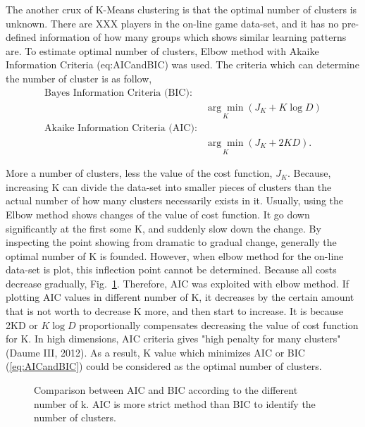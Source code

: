 \documentclass[12pt,a4paper]{report}
\begin{document}

\bigskip
The another crux of K-Means clustering is that the optimal number of clusters is unknown. There are XXX players in the on-line game data-set, and it has no pre-defined information of how many groups which shows similar learning patterns are. To estimate optimal number of clusters, Elbow method with Akaike Information Criteria (eq:AICandBIC) was used. The criteria which can determine the number of cluster is as follow,
\begin{equation} \label{eq:AICandBIC}
    \begin{split}
        \textrm{Bayes Information Criteria (BIC)}:&\\
        &\underset{K}{\arg\min} (J_K + K\log D)\\
        \textrm{Akaike Information Criteria (AIC)}:&\\
        &\underset{K}{\arg\min} (J_K + 2KD).
    \end{split}
\end{equation}

More a number of clusters, less the value of the cost function, $J_K$. Because, increasing K can divide the data-set into smaller pieces of clusters than the actual number of how many clusters necessarily exists in it. Usually, using the Elbow method shows changes of the value of cost function. It go down significantly at the first some K, and suddenly slow down the change. By inspecting the point showing from dramatic to gradual change, generally the optimal number of K is founded. However, when elbow method for the on-line data-set is plot, this inflection point cannot be determined. Because all costs decrease gradually, Fig.~\ref{fig:AIC_BIC_Elbow}. Therefore, AIC was exploited with elbow method. If plotting AIC values in different number of K, it decreases by the certain amount that is not worth to decrease K more, and then start to increase. It is because 2KD or  $K\log D$ proportionally compensates decreasing the value of cost function for K. In high dimensions, AIC criteria gives "high penalty for many clusters" (Daume III, 2012). As a result, K value which minimizes AIC or BIC (\ref{eq:AICandBIC}) could be considered as the optimal number of clusters. 

\begin{figure}[thpb]\label{fig:AIC_BIC_Elbow}
	\centering
	\caption{Comparison between AIC and BIC according to the different number of k. AIC is more strict method than BIC to identify the number of clusters.}
\end{figure}
\end{document}
